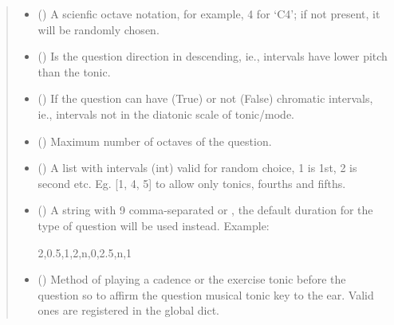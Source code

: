 \documentclass[letterpaper,10pt,english]{sphinxmanual}
\begin{document}
\begin{fulllineitems}
\begin{fulllineitems}
\begin{quote}
\begin{description}
\begin{itemize}
\item {} 
 () \textendash{} A scienfic octave notation, for example, 4 for ‘C4’;
if not present, it will be randomly chosen.

\item {} 
 () \textendash{} Is the question direction in descending, ie.,
intervals have lower pitch than the tonic.

\item {} 
 () \textendash{} If the question can have (True) or not (False)
chromatic intervals, ie., intervals not in the diatonic scale
of tonic/mode.

\item {} 
 () \textendash{} Maximum number of octaves of the question.

\item {} 
 () \textendash{} A list with intervals (int) valid for
random choice, 1 is 1st, 2 is second etc. Eg. {[}1, 4, 5{]} to
allow only tonics, fourths and fifths.

\item {} 
 () \textendash{} 
A string with 9 comma-separated  or
, the
default duration for the type of question will be used instead.
Example:

\begin{sphinxVerbatim}[commandchars=\\\{\}]
\PYGZdq{}2,0.5,1,2,n,0,2.5,n,1\PYGZdq{}
\end{sphinxVerbatim}


\item {} 
 () \textendash{} Method of playing a cadence or the
exercise tonic before the question so to affirm the question
musical tonic key to the ear. Valid ones are registered in the
 global dict.


\end{itemize}
\end{description}
\end{quote}
\end{fulllineitems}
\end{fulllineitems}
\end{document}
